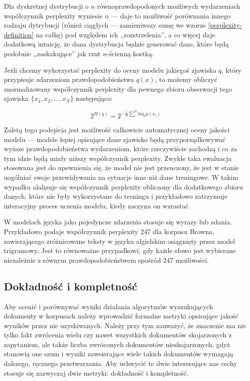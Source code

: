 \documentclass[11pt,a4paper]{article}
\begin{document}
Dla dyskretnej dystrybucji o $n$ równoprawdopodonych możliwych wydarzeniach
współczynnik perplexity wyniesie $n$ --- daje to możliwość porównania innego
rodzaju dytrybucji (rónież ciągłych --- zamieniwszy sumę we wzorze
\ref{perplexity-definition} na całkę) pod względem ich ,,rozstrzelenia'', a co
więcej daje dodatkową intuicję, że dana dystrybucja będzie generować dane,
które będą podobnie ,,zaskakujące'' jak rzut $n$-ścienną kostką.

Jeżli chcemy wykorzystać perplexity do oceny modelu jakiegoś zjawiska $q$,
który przypisuje zdarzeniom prawdopodobieństwa $q(x)$, to możemy obliczyć
znormalizowany współczynnik perplexity dla pewnego zbioru obserwacji tego zjawiska
$\{x_1, x_2, \ldots, x_N\}$ następująco:

\begin{equation}
  2^{H(q)} = 2^{-\frac{1}{N}\sum_i^N log_2 p(x_i)}
\end{equation}

Zaletą tego podejścia jest możliwość całkowicie automatycznej oceny jakości
modelu --- modele lepiej opisujące dane zjawisko będą przyporządkowywać wyższe
prawdopodobieństwa wydarzeniom, które rzeczywiście zachodzą i co za tym idzie
będą miały niższy współczynnik perplexity. Zwykle taka ewaluacja stosowana jest
do upewnienia się, że model nie jest przeuczony, że jest w stanie uogólniać
swoje przewidywania na sytuacje inne niż dane treningowe. W takim wypadku
alalizuje się współczynnik perplexity obliczony dla dodatkowego zbioru
danych, które nie były wykorzystane do treningu i przykładowo zatrzymuje
interacyjny proces uczenia modelu, kiedy zaczyna on wzrastać.

W modelach języka jako pojedyncze zdarzenia stosuje się wyrazy lub zdania.
Przykładowo \cite{perplexity-estimate} podaje współczynnik perplexity 247 dla
korpusu Browna, zawierającego zróżnicowane teksty w języku algielskim
osiągnięty przez model trigramowy. Jest to równoważne przypadkowi, gdy każde
słowo jest wybierane niezależnie z równym prawdopodobieństwem spośród 247
możliwości.

\subsection{Dokładność i kompletność}

Aby ocenić i porównywać wyniki działania algorytmów wyszukujących dokumenty w
korpusach należy wprowadzić formalne metryki opsisujące jakość wyników przez
nie uzyskiwanych. Należy przy tym zauważyć, że znaczenie ma nie tylko fakt
zwrócenia wielu czy nawet wszystkich dokumentów skojarzonych z zapytaniem, ale
także liczba zwróconych dokumentów nieskojarzonych, gdyż stanowią one szum i
wyniki zaweierające wiele takich dokumentów wymagają dalszego, ręcznego
przetwarzania. Aby uchwycić te dwie interesujące nas cechy stosuje się
zazwyczaj dwie metryki: dokładność i kompletność.
\end{document}
